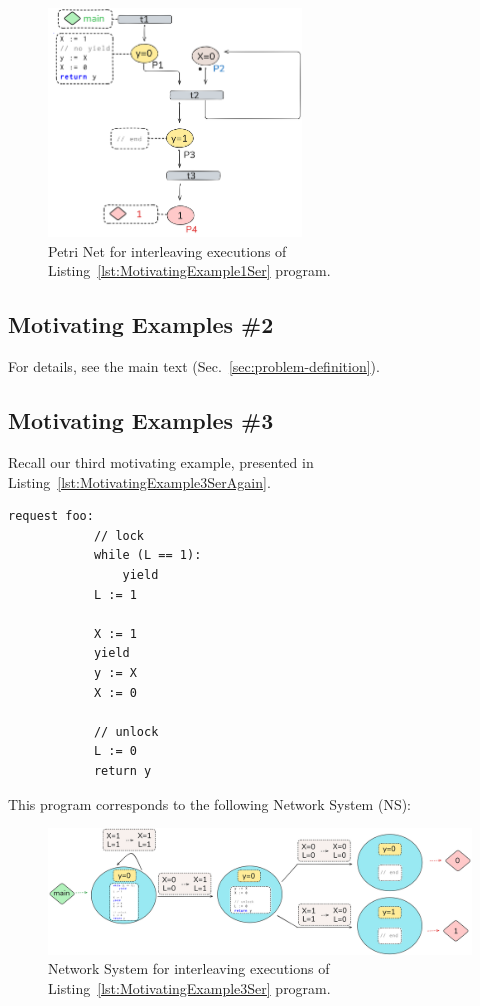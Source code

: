 \begin{figure}[htbp]
	\centering
	\includegraphics[width=0.6\textwidth]{plots/code_1_PN_with_annotation.png}
	\caption{Petri Net for interleaving executions of Listing~\ref{lst:MotivatingExample1Ser} program.}
	\label{fig:code1ExamplePN}
\end{figure}

%

\subsection{Motivating Examples \#2}
\label{appendix:subsec::Ex1B:NS}

For details, see the main text (Sec.~\ref{sec:problem-definition}).


\subsection{Motivating Examples \#3}
\label{appendix:subsec:Ex1C:NS}

Recall our third motivating example, presented in Listing~\ref{lst:MotivatingExample3SerAgain}.

\begin{minipage}[t]{0.3\textwidth}
	\begin{lstlisting}[caption={With yield and lock (serializable)}]
		request foo: 
			// lock
			while (L == 1): 
				yield
			L := 1 
		
			X := 1
			yield
			y := X 
			X := 0
		
			// unlock    
			L := 0
			return y 
	\end{lstlisting}
\end{minipage}

This program corresponds to the following Network System (NS):

\begin{figure}[htbp]
	\centering
	\includegraphics[width=1.1\textwidth]{plots/code_3_NS.png}
	\caption{Network System for interleaving executions of Listing~\ref{lst:MotivatingExample3Ser} program.}
	\label{fig:code3ExampleNS}
\end{figure}


